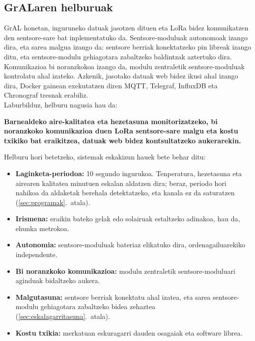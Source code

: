 \documentclass[10pt]{article}
\begin{document}
\subsection{\acs{GrAL}aren helburuak}
\label{sec:eskakizunak}

\ac{GrAL} honetan, inguruneko datuak jasotzen dituen eta \ac{LoRa} bidez komunikatzen den sentsore-sare bat inplementatuko da. Sentsore-moduluak autonomoak izango dira, eta sarea malgua izango da: sentsore berriak konektatzeko pin libreak izango ditu, eta sentsore-modulu gehiagotara zabaltzeko baldintzak aztertuko dira. Komunikazioa bi noranzkokoa izango da, modulu zentraletik sentsore-moduluak kontrolatu ahal izateko. Azkenik, jasotako datuak web bidez ikusi ahal izango dira, Docker gainean exekutatzen diren \ac{MQTT}, Telegraf, InfluxDB eta Chronograf tresnak erabiliz.\\

Laburbilduz, helburu nagusia hau da:\\

\begin{shaded}
    \noindent \centering \textbf{Barnealdeko aire-kalitatea eta hezetasuna monitorizatzeko, bi noranzkoko komunikazioa duen \ac{LoRa} sentsore-sare malgu eta kostu txikiko bat eraikitzea, datuak web bidez kontsultatzeko aukerarekin.}
\end{shaded}

Helburu hori betetzeko, sistemak eskakizun hauek bete behar ditu:
\begin{itemize}
    \item \textbf{Laginketa-periodoa:} 10 segundo ingurukoa. Tenperatura, hezetasuna eta airearen kalitatea minutuen eskalan aldatzen dira; beraz, periodo hori nahikoa da aldaketak berehala detektatzeko, eta kanala ez da saturatzen (\ref{sec:programak}.~atala).
    \item \textbf{Irismena:} eraikin bateko gelak edo solairuak estaltzeko adinakoa, hau da, ehunka metrokoa.
    \item \textbf{Autonomia:} sentsore-moduluak bateriaz elikatuko dira, ordenagailuarekiko independente.
    \item \textbf{Bi noranzkoko komunikazioa:} modulu zentraletik sentsore-moduluari aginduak bidaltzeko aukera.
    \item \textbf{Malgutasuna:} sentsore berriak konektatu ahal izatea, eta sarea sentsore-modulu gehiagotara zabaltzeko bidea zehaztea (\ref{sec:eskalagarritasuna}.~atala).
    \item \textbf{Kostu txikia:} merkatuan eskuragarri dauden osagaiak eta software librea.
\end{itemize}
\end{document}
